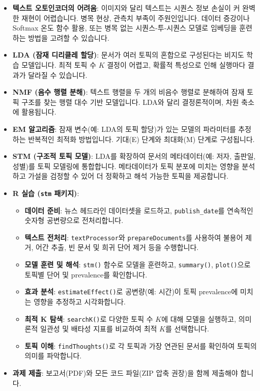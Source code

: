 \documentclass[11pt,a4paper]{article}
\theoremstyle{definition}
\begin{document}
\begin{tcolorbox}[summary={CSCI89 Lecture 8 핵심 요약}]
\begin{itemize}[noitemsep,topsep=0pt,parsep=0pt,partopsep=0pt]
    \item \textbf{텍스트 오토인코더의 어려움}: 이미지와 달리 텍스트는 시퀀스 정보 손실이 커 완벽한 재현이 어렵습니다. 병목 현상, 관측치 부족이 주원인입니다. 데이터 증강이나 Softmax 온도 함수 활용, 또는 병목 없는 시퀀스-투-시퀀스 모델로 임베딩을 훈련하는 방법을 고려할 수 있습니다.
    \item \textbf{LDA (잠재 디리클레 할당)}: 문서가 여러 토픽의 혼합으로 구성된다는 비지도 학습 모델입니다. 최적 토픽 수 $K$ 결정이 어렵고, 확률적 특성으로 인해 실행마다 결과가 달라질 수 있습니다.
    \item \textbf{NMF (음수 행렬 분해)}: 텍스트 행렬을 두 개의 비음수 행렬로 분해하여 잠재 토픽 구조를 찾는 행렬 대수 기반 모델입니다. LDA와 달리 결정론적이며, 차원 축소에 활용됩니다.
    \item \textbf{EM 알고리즘}: 잠재 변수(예: LDA의 토픽 할당)가 있는 모델의 파라미터를 추정하는 반복적인 최적화 방법입니다. 기대(E) 단계와 최대화(M) 단계로 구성됩니다.
    \item \textbf{STM (구조적 토픽 모델)}: LDA를 확장하여 문서의 메타데이터(예: 저자, 출판일, 성별)를 토픽 모델링에 통합합니다. 메타데이터가 토픽 분포에 미치는 영향을 분석하고 가설을 검정할 수 있어 더 정확하고 해석 가능한 토픽을 제공합니다.
    \item \textbf{R 실습 (\texttt{stm} 패키지)}:
    \begin{itemize}
        \item \textbf{데이터 준비}: 뉴스 헤드라인 데이터셋을 로드하고, \texttt{publish_date}를 연속적인 숫자형 공변량으로 전처리합니다.
        \item \textbf{텍스트 전처리}: \texttt{textProcessor}와 \texttt{prepareDocuments}를 사용하여 불용어 제거, 어간 추출, 빈 문서 및 희귀 단어 제거 등을 수행합니다.
        \item \textbf{모델 훈련 및 해석}: \texttt{stm()} 함수로 모델을 훈련하고, \texttt{summary()}, \texttt{plot()}으로 토픽별 단어 및 prevalence를 확인합니다.
        \item \textbf{효과 분석}: \texttt{estimateEffect()}로 공변량(예: 시간)이 토픽 prevalence에 미치는 영향을 추정하고 시각화합니다.
        \item \textbf{최적 K 탐색}: \texttt{searchK()}로 다양한 토픽 수 $K$에 대해 모델을 실행하고, 의미론적 일관성 및 배타성 지표를 비교하여 최적 $K$를 선택합니다.
        \item \textbf{토픽 이해}: \texttt{findThoughts()}로 각 토픽과 가장 연관된 문서를 확인하여 토픽의 의미를 파악합니다.
    \end{itemize}
    \item \textbf{과제 제출}: 보고서(PDF)와 모든 코드 파일(ZIP 압축 권장)을 함께 제출해야 합니다.
\end{itemize}
\end{tcolorbox}
\end{document}

